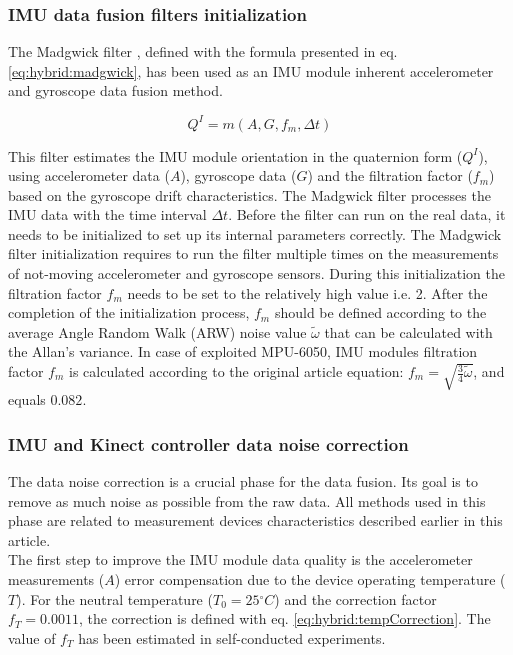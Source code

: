 \documentclass[sensors,article,submit,moreauthors,pdftex,10pt,a4paper]{mdpi}
\newcommand{\degree}{\ensuremath{{}^{\circ}}\xspace}
\begin{document}
	\subsubsection{IMU data fusion filters initialization}
	The Madgwick filter \cite{Madgwick2011}, defined with the formula presented in eq. \ref{eq:hybrid:madgwick}, has been used as an IMU module inherent accelerometer and gyroscope data fusion method. 
	
	\begin{equation}
		Q^I=m(A,G,f_m,\Delta t)
		\label{eq:hybrid:madgwick}
	\end{equation}
	
	This filter estimates the IMU module orientation in the quaternion form ($Q^I$), using accelerometer data ($A$), gyroscope data ($G$) and the filtration factor ($f_m$) based on the gyroscope drift characteristics. The Madgwick filter processes the IMU data with the time interval $\Delta t$. Before the filter can run on the real data, it needs to be initialized to set up its internal parameters correctly. The Madgwick filter initialization requires to run the filter multiple times on the measurements of not-moving accelerometer and gyroscope sensors. During this initialization the filtration factor $f_m$ needs to be set to the relatively high value i.e. 2. After the completion of the initialization process, $f_m$ should be defined according to the average Angle Random Walk (ARW) noise value $\widetilde{\omega}$ that can be calculated with the Allan’s variance\cite{FreescaleSemiconductor2015,Allan1966,Allan1987}. In case of exploited MPU-6050, IMU modules filtration factor $f_m$ is calculated according to the original article \cite{Madgwick2011} equation: $f_m = \sqrt{\frac{3}{4}\widetilde{\omega}}$, and equals $0.082$. 
	
	\subsubsection{IMU and Kinect controller data noise correction}
	The data noise correction is a crucial phase for the data fusion. Its goal is to remove as much noise as possible from the raw data. All methods used in this phase are related to measurement devices characteristics described earlier in this article.\\
	The first step to improve the IMU module data quality is the accelerometer measurements ($A$) error compensation due to the device operating temperature ($T$). For the neutral temperature ($T_0=25\degree C$) and the correction factor $f_T= 0.0011$, the correction is defined with eq. \ref{eq:hybrid:tempCorrection}. The value of $f_T$ has been estimated in self-conducted experiments.
	
\end{document}
